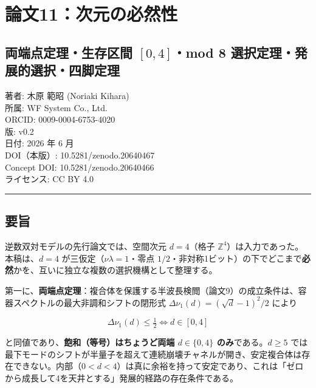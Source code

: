 \documentclass[
]{ltjsarticle}
\author{}
\date{}
\begin{document}
\section{論文11：次元の必然性}\label{ux8ad6ux658711ux6b21ux5143ux306eux5fc5ux7136ux6027}

\subsection{\texorpdfstring{両端点定理・生存区間 \([0,4]\)・mod 8
選択定理・発展的選択・四脚定理}{両端点定理・生存区間 {[}0,4{]}・mod 8 選択定理・発展的選択・四脚定理}}\label{ux4e21ux7aefux70b9ux5b9aux7406ux751fux5b58ux533aux9593-04mod-8-ux9078ux629eux5b9aux7406ux767aux5c55ux7684ux9078ux629eux56dbux811aux5b9aux7406}

著者: 木原 範昭 (Noriaki Kihara)\\
所属: WF System Co., Ltd.\\
ORCID: 0009-0004-6753-4020\\
版: v0.2\\
日付: 2026 年 6 月\\
DOI（本版）: 10.5281/zenodo.20640467\\
Concept DOI: 10.5281/zenodo.20640466\\
ライセンス: CC BY 4.0

\begin{center}\rule{0.5\linewidth}{0.5pt}\end{center}

\subsection{要旨}\label{ux8981ux65e8}

逆数双対モデルの先行論文では、空間次元 \(d=4\)（格子
\(\mathbb{Z}^4\)）は入力であった。本稿は、\(d=4\)
が三仮定（\(\nu\lambda=1\)・零点
\(1/2\)・非対称1ビット）の下でどこまで\textbf{必然}かを、互いに独立な複数の選択機構として整理する。

第一に、\textbf{両端点定理}：複合体を保護する半波長検閲（論文9）の成立条件は、容器スペクトルの最大非調和シフトの閉形式
\(\Delta\nu_1(d)=(\sqrt d-1)^2/2\) により

\[
\Delta\nu_1(d)\le\tfrac12\iff d\in[0,4]
\]

と同値であり、\textbf{飽和（等号）はちょうど両端 \(d\in\{0,4\}\)
のみ}である。\(d\ge5\)
では最下モードのシフトが半量子を超えて連続崩壊チャネルが開き、安定複合体は存在できない。内部（\(0<d<4\)）は真に余裕を持って安定であり、これは「ゼロから成長して4を天井とする」発展的経路の存在条件である。
\end{document}
